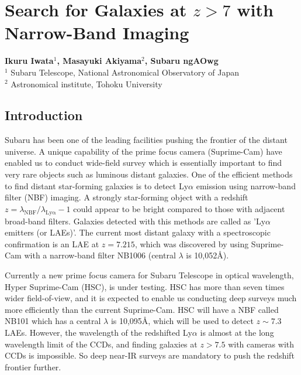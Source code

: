\def\thisdir{science/veryhighz/}


\section{Search for Galaxies at $z>7$ with Narrow-Band Imaging
\label{sec:nbf}}

\noindent
\begin{center}
{\bf Ikuru Iwata$^{1}$, Masayuki Akiyama$^{2}$, Subaru ngAOwg}\\
$^1$ Subaru Telescope, National Astronomical Observatory of Japan\\
$^2$ Astronomical institute, Tohoku University
\end{center}
\vspace{0.5cm}

\subsection{Introduction}

Subaru has been one of the leading facilities pushing the frontier of
the distant universe. A unique capability of the prime focus camera
(Suprime-Cam) have enabled us to conduct wide-field survey which is
essentially important to find very rare objects such as luminous distant
galaxies. One of the efficient methods to find distant star-forming
galaxies is to detect Ly$\alpha$ emission using narrow-band filter (NBF) 
imaging. A strongly star-forming object with a redshift 
$z = \lambda_\mathrm{NBF} / \lambda_\mathrm{Ly\alpha} -1$ could
appear to be bright compared to those with adjacent broad-band
filters. Galaxies detected with this methods are called as 'Ly$\alpha$
emitters (or LAEs)'. The current most distant galaxy with a spectroscopic 
confirmation is an LAE at $z=7.215$, which was discovered by
\citet{Shibuya2012} using Suprime-Cam with a narrow-band filter NB1006
(central $\lambda$ is 10,052\AA).

Currently a new prime focus camera for Subaru Telescope in optical
wavelength, Hyper Suprime-Cam (HSC), is under testing. HSC has more than
seven times wider field-of-view, and it is expected to enable us
conducting deep surveys much more efficiently than the current
Suprime-Cam. HSC will have a NBF called NB101 which has a central
$\lambda$ is 10,095\AA, which will be used to detect $z\sim 7.3$
LAEs. 
However, the wavelength of the redshifted Ly$\alpha$ is almost at the
long wavelength limit of the CCDs, and finding galaxies at $z>7.5$ with
cameras with CCDs is impossible. So deep near-IR surveys are mandatory
to push the redshift frontier further.

